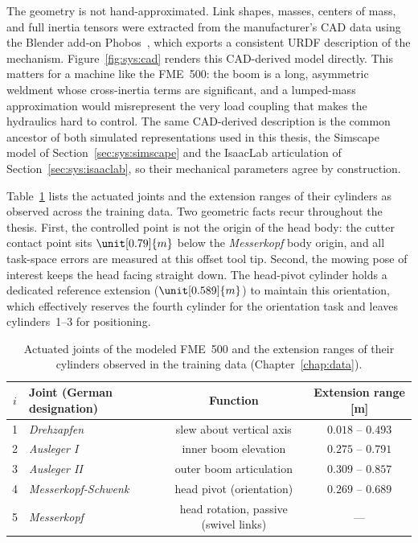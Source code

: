 The geometry is not hand-approximated. Link shapes, masses, centers of
mass, and full inertia tensors were extracted from the manufacturer's
CAD data using the Blender add-on
Phobos~\cite{vonszadkowski2020phobos}, which exports a consistent URDF
description of the mechanism. Figure~\ref{fig:sys:cad} renders this
CAD-derived model directly. This matters for a machine like the
FME~500: the boom is a long, asymmetric weldment whose cross-inertia
terms are significant, and a lumped-mass approximation would
misrepresent the very load coupling that makes the hydraulics hard to
control. The same CAD-derived description is the common ancestor of
both simulated representations used in this thesis, the Simscape model
of Section~\ref{sec:sys:simscape} and the IsaacLab articulation of
Section~\ref{sec:sys:isaaclab}, so their mechanical parameters agree by
construction.

Table~\ref{tab:sys:cylinders} lists the actuated joints and the
extension ranges of their cylinders as observed across the training
data. Two geometric facts recur throughout the thesis. First, the
controlled point is not the origin of the head body: the cutter contact
point sits $\unit[0.79]{m}$ below the \emph{Messerkopf} body origin,
and all task-space errors are measured at this offset tool tip. Second,
the mowing pose of interest keeps the head facing straight down. The
head-pivot cylinder holds a dedicated reference extension
($\unit[0.589]{m}$) to maintain this orientation, which effectively
reserves the fourth cylinder for the orientation task and leaves
cylinders~1--3 for positioning.

\begin{table}[tb]
  \centering
  \caption{Actuated joints of the modeled FME~500 and the extension
  ranges of their cylinders observed in the training data
  (Chapter~\ref{chap:data}).}
  \label{tab:sys:cylinders}
  \begin{tabular}{clcc}
    \toprule
    $i$ & Joint (German designation) & Function & Extension range [m] \\
    \midrule
    1 & \emph{Drehzapfen}         & slew about vertical axis & $0.018$ -- $0.493$ \\
    2 & \emph{Ausleger I}         & inner boom elevation     & $0.275$ -- $0.791$ \\
    3 & \emph{Ausleger II}        & outer boom articulation  & $0.309$ -- $0.857$ \\
    4 & \emph{Messerkopf-Schwenk} & head pivot (orientation) & $0.269$ -- $0.689$ \\
    \midrule
    5 & \emph{Messerkopf}         & head rotation, passive (swivel links) & --- \\
    \bottomrule
  \end{tabular}
\end{table}


